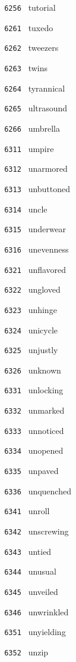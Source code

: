 \documentclass[11pt]{article}
\begin{document}
\begin{multicols}{6}
\noindent \texttt{ 6256 } tutorial  \par
\noindent \texttt{ 6261 } tuxedo  \par
\noindent \texttt{ 6262 } tweezers  \par
\noindent \texttt{ 6263 } twins  \par
\noindent \texttt{ 6264 } tyrannical  \par
\noindent \texttt{ 6265 } ultrasound  \par
\noindent \texttt{ 6266 } umbrella  \par
\noindent \texttt{ 6311 } umpire  \par
\noindent \texttt{ 6312 } unarmored  \par
\noindent \texttt{ 6313 } unbuttoned  \par
\noindent \texttt{ 6314 } uncle  \par
\noindent \texttt{ 6315 } underwear  \par
\noindent \texttt{ 6316 } unevenness  \par
\noindent \texttt{ 6321 } unflavored  \par
\noindent \texttt{ 6322 } ungloved  \par
\noindent \texttt{ 6323 } unhinge  \par
\noindent \texttt{ 6324 } unicycle  \par
\noindent \texttt{ 6325 } unjustly  \par
\noindent \texttt{ 6326 } unknown  \par
\noindent \texttt{ 6331 } unlocking  \par
\noindent \texttt{ 6332 } unmarked  \par
\noindent \texttt{ 6333 } unnoticed  \par
\noindent \texttt{ 6334 } unopened  \par
\noindent \texttt{ 6335 } unpaved  \par
\noindent \texttt{ 6336 } unquenched  \par
\noindent \texttt{ 6341 } unroll  \par
\noindent \texttt{ 6342 } unscrewing  \par
\noindent \texttt{ 6343 } untied  \par
\noindent \texttt{ 6344 } unusual  \par
\noindent \texttt{ 6345 } unveiled  \par
\noindent \texttt{ 6346 } unwrinkled  \par
\noindent \texttt{ 6351 } unyielding  \par
\noindent \texttt{ 6352 } unzip  \par

\end{multicols}
\end{document}
